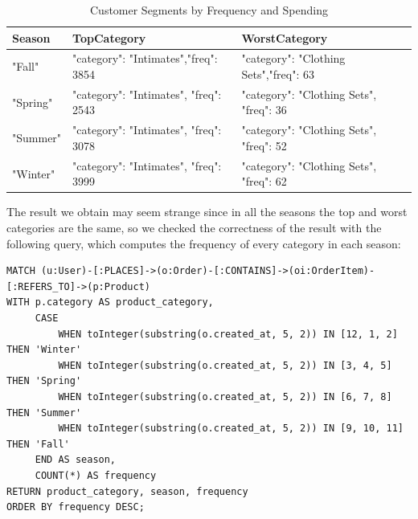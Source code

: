 \documentclass[a4paper,12pt]{article}
\begin{document}
\begin{table}[h!]
  \centering
  \caption{Customer Segments by Frequency and Spending}
  \label{tab:customer_segments}
  \begin{tabular}{l l l}
      \toprule
      \textbf{Season} & \textbf{TopCategory} & \textbf{WorstCategory}\\
      \midrule
      "Fall" & {"category": "Intimates","freq": 3854} & {"category": "Clothing Sets","freq": 63} \\
      "Spring" & {"category": "Intimates", "freq": 2543} & {"category": "Clothing Sets", "freq": 36} \\
      "Summer" & {"category": "Intimates", "freq": 3078} & {"category": "Clothing Sets", "freq": 52} \\
      "Winter" & {"category": "Intimates", "freq": 3999} & {"category": "Clothing Sets", "freq": 62} \\
      \bottomrule
  \end{tabular}
\end{table}
The result we obtain may seem strange since in all the seasons the top and worst categories are the same, so we checked the correctness of the result with the following query, which computes the frequency of every category in each season:
\begin{verbatim}
MATCH (u:User)-[:PLACES]->(o:Order)-[:CONTAINS]->(oi:OrderItem)-[:REFERS_TO]->(p:Product)
WITH p.category AS product_category, 
     CASE 
         WHEN toInteger(substring(o.created_at, 5, 2)) IN [12, 1, 2] THEN 'Winter'
         WHEN toInteger(substring(o.created_at, 5, 2)) IN [3, 4, 5] THEN 'Spring'
         WHEN toInteger(substring(o.created_at, 5, 2)) IN [6, 7, 8] THEN 'Summer'
         WHEN toInteger(substring(o.created_at, 5, 2)) IN [9, 10, 11] THEN 'Fall'
     END AS season, 
     COUNT(*) AS frequency
RETURN product_category, season, frequency
ORDER BY frequency DESC;
\end{verbatim}
\end{document}
